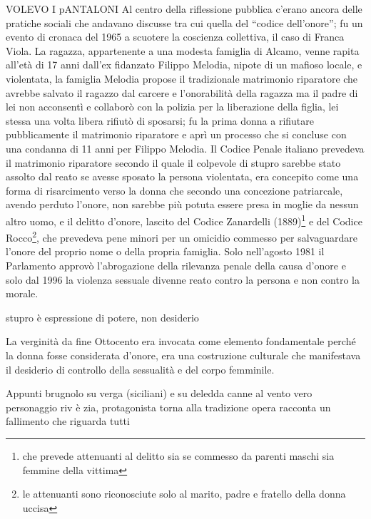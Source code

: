 VOLEVO I pANTALONI
Al centro della riflessione pubblica c'erano ancora delle pratiche sociali che andavano discusse tra cui quella del \enquote{codice dell'onore}; fu un evento di cronaca del 1965 a scuotere la coscienza collettiva, il caso di Franca Viola.
La ragazza, appartenente a una modesta famiglia di Alcamo, venne rapita all'età di 17 anni dall'ex fidanzato Filippo Melodia, nipote di un mafioso locale, e violentata, la famiglia Melodia propose il tradizionale matrimonio riparatore che avrebbe salvato il ragazzo dal carcere e l'onorabilità della ragazza ma il padre di lei non acconsentì e collaborò con la polizia per la liberazione della figlia, lei stessa una volta libera rifiutò di sposarsi; fu la prima donna a rifiutare pubblicamente il matrimonio riparatore e aprì un processo che si concluse con una condanna di 11 anni per Filippo Melodia.
Il Codice Penale italiano prevedeva il matrimonio riparatore secondo il quale il colpevole di stupro sarebbe stato assolto dal reato se avesse sposato la persona violentata, era concepito come una forma di risarcimento verso la donna che secondo una concezione patriarcale, avendo perduto l'onore, non sarebbe più potuta essere presa in moglie da nessun altro uomo, e il delitto d'onore, lascito del Codice Zanardelli (1889)\footnote{che prevede attenuanti al delitto sia se commesso da parenti maschi sia femmine della vittima} e del Codice Rocco\footnote{le attenuanti sono riconosciute solo al marito, padre e fratello della donna uccisa}, che prevedeva pene minori per un omicidio commesso per salvaguardare l'onore del proprio nome o della propria famiglia.
Solo nell'agosto 1981 il Parlamento approvò l'abrogazione della rilevanza penale della causa d'onore e solo dal 1996 la violenza sessuale divenne reato contro la persona e non contro la morale.

stupro è espressione di potere, non desiderio


La verginità da fine Ottocento era invocata come elemento fondamentale perché la donna fosse considerata d'onore, era una costruzione culturale che manifestava il desiderio di controllo della sessualità e del corpo femminile.

Appunti brugnolo su verga (siciliani) e su deledda canne al vento
vero personaggio riv è zia, protagonista torna alla tradizione
opera racconta un fallimento che riguarda tutti

